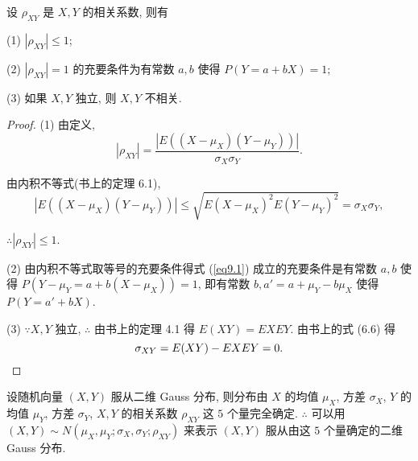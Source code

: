 \documentclass{ctexart}
\begin{document}
\begin{theorem}[书上的定理 6.2]
    设 $\rho_{XY}$ 是 $X,Y$ 的相关系数, 则有
    
    (1) $|\rho_{XY}|\leq 1$;

    (2) $|\rho_{XY}|=1$ 的充要条件为有常数 $a,b$ 使得 $P(Y=a+bX)=1$;

    (3) 如果 $X,Y$ 独立, 则 $X,Y$ 不相关.
\end{theorem}
\begin{proof}
    (1) 由定义,
    \[|\rho_{XY}|=\dfrac{|E((X-\mu_X)(Y-\mu_Y))|}{\sigma_X\sigma_Y}.\]

    由内积不等式(书上的定理 6.1),
    \begin{equation}\label{eq9.1}
        |E((X-\mu_X)(Y-\mu_Y))|\leq\sqrt{E(X-\mu_X)^2E(Y-\mu_Y)^2}=\sigma_X\sigma_Y,
    \end{equation}

    $\therefore|\rho_{XY}|\leq 1$.

    (2) 由内积不等式取等号的充要条件得式 (\ref{eq9.1}) 成立的充要条件是有常数 $a,b$ 使得 $P(Y-\mu_Y=a+b(X-\mu_X))=1$, 即有常数 $b,a'=a+\mu_Y-b\mu_X$ 使得 $P(Y=a'+bX)$.

    (3) $\because X,Y$ 独立, $\therefore$ 由书上的定理 4.1 得 $E(XY)=EXEY$. 由书上的式 (6.6) 得
    \[\sigma_{XY}=E(XY)-EXEY=0.\qedhere\]
\end{proof}

设随机向量 $(X,Y)$ 服从二维 Gauss 分布, 则分布由 $X$ 的均值 $\mu_X$, 方差 $\sigma_X$, $Y$ 的均值 $\mu_Y$, 方差 $\sigma_Y$, $X,Y$ 的相关系数 $\rho_{XY}$ 这 $5$ 个量完全确定. $\therefore$ 可以用 $(X,Y)\sim N(\mu_X,\mu_Y;\sigma_X,\sigma_Y;\rho_{XY})$ 来表示 $(X,Y)$ 服从由这 $5$ 个量确定的二维 Gauss 分布.
\end{document}
